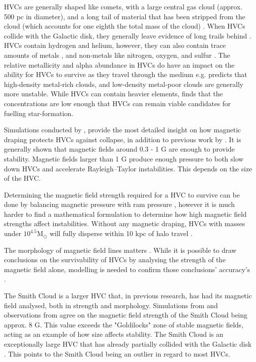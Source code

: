 HVCs are generally shaped like comets, with a large central gas cloud (approx. 500 pc in diameter), and a long tail of material that has been stripped from the cloud (which accounts for one eighth the total mass of the cloud) \cite{ID34, ID13}. When HVCs collide with the Galactic disk, they generally leave evidence of long trails behind \cite{ID19}. HVCs contain hydrogen and helium, however, they can also contain trace amounts of metals \cite{ID46}, and non-metals like nitrogen, oxygen, and sulfur \cite{ID48, ID49}. The relative metallicity and alpha abundance in HVCs do have an impact on the ability for HVCs to survive as they travel through the medium e.g. \citep{ID24} predicts that high-density metal-rich clouds, and low-density metal-poor clouds are generally more unstable. While HVCs can contain heavier elements, \citep{ID46} finds that the concentrations are low enough that HVCs can remain viable candidates for fuelling star-formation.

Simulations conducted by \citep{ID23, ID24, ID33}, provide the most detailed insight on how magnetic draping protects HVCs against collapse, in addition to previous work by \citep{ID11, ID13, ID25}. It is generally shown that magnetic fields around 0.3 - 1 {\textmu}G are enough to provide stability. Magnetic fields larger than 1 {\textmu}G produce enough pressure to both slow down HVCs and accelerate Rayleigh–Taylor instabilities. This depends on the size of the HVC.

Determining the magnetic field strength required for a HVC to survive can be done by balancing magnetic pressure with ram pressure \cite{ID13}, however it is much harder to find a mathematical formulation to determine how high magnetic field strengths affect instabilities. Without any magnetic draping, HVCs with masses under $10^{4.5} \mathrm{M}_{\odot}$ will fully disperse within 10 kpc of halo travel \cite{ID25}.

The morphology of magnetic field lines matters \cite{ID24}. While it is possible to draw conclusions on the survivability of HVCs by analysing the strength of the magnetic field alone, modelling is needed to confirm those conclusions' accuracy's \cite{ID5}.

The Smith Cloud is a larger HVC that, in previous research, has had its magnetic field analysed, both in strength and morphology. Simulations from \citep{ID23} and observations from \citep{ID28} agree on the magnetic field strength of the Smith Cloud being approx. 8 {\textmu}G. This value exceeds the "Goldilocks" zone of stable magnetic fields, acting as an example of how size affects stability. The Smith Cloud is an exceptionally large HVC that has already partially collided with the Galactic disk \cite{ID28, ID35}. This points to the Smith Cloud being an outlier in regard to most HVCs.

